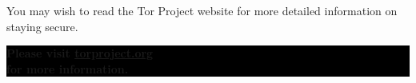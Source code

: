 \documentclass[10.5pt,a4paper]{article} %
\begin{document}
\begin{multicols*}{2}
You may wish to read the Tor Project website for more detailed information on staying secure.


\begin{center}
	\vfill %
	\colorbox{Black}{
		\begin{minipage}{8cm}
			\color{white}
			\vspace{0.2cm}
			\begin{center}
				\textbf{{\Large Please visit \url{torproject.org}\\for more information.}}
			\end{center}
			\vspace{0.2cm}
		\end{minipage}
	}
\end{center}

\vspace{0.75cm}

\end{multicols*}
\end{document}
